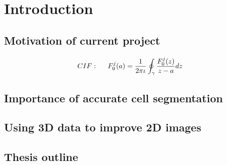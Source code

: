 
\chapter{Introduction}  %

\ifpdf
    \graphicspath{{Chapter1/Figs/Raster/}{Chapter1/Figs/PDF/}{Chapter1/Figs/}}
\else
    \graphicspath{{Chapter1/Figs/Vector/}{Chapter1/Figs/}}
\fi

\section{Motivation of current project} %
\label{section1.1}

\begin{align}
CIF: \hspace*{5mm}F_0^j(a) = \frac{1}{2\pi \iota} \oint_{\gamma} \frac{F_0^j(z)}{z - a} dz
\end{align}

\section{Importance of accurate cell segmentation} %
\label{section1.2}


\section{Using 3D data to improve 2D images}  %
\label{section1.3}


\section{Thesis outline}  %
\label{section1.4}

